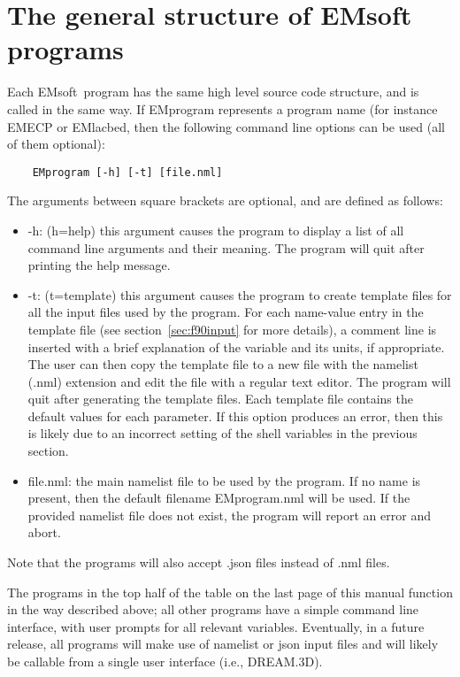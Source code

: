 \documentclass[DIV=calc, paper=letter, fontsize=11pt]{scrartcl}	 %
\newcommand{\ctp}{\textsf{EMsoft}}
\begin{document}
\section{The general structure of EMsoft programs\label{sec:structure}}
Each \ctp\ program has the same high level source code structure, and is called in the same way.  If \textsf{EMprogram} represents 
a program name (for instance \textsf{EMECP} or \textsf{EMlacbed}, then the following command line options can be used (all of them optional):
\begin{verbatim}
	EMprogram [-h] [-t] [file.nml]
\end{verbatim}
The arguments  between square brackets are optional, and are defined as follows:
\begin{itemize}
	\item \textsf{-h}: (h=help) this argument causes the program to display a list of all command line arguments and their meaning.  The program will quit after printing 
	the help message.
	\item \textsf{-t}: (t=template) this argument causes the program to create template files for all the input files used by the program.  For each
	name-value entry in the template file (see section~\ref{sec:f90input} for more details), a comment line is inserted with a brief explanation 
	of the variable and its units, if appropriate.  The user can then copy the template file to a new file with the namelist (.nml) extension and edit the 
	file with a regular text editor.  The program will quit after generating the template files.  Each template file contains the default values for each parameter.
	If this option produces an error, then this is likely due to an incorrect setting of the shell variables in the previous section.
	\item \textsf{file.nml}: the main namelist file to be used by the program.  If no name is present, then the default filename \textsf{EMprogram.nml} will be used.  If the 
	provided namelist file does not exist, the program will report an error and abort.
\end{itemize}
Note that the programs will also accept .json files instead of .nml files.

The programs in the top half of the table on the last page of this manual function in the way described above; all other programs
have a simple command line interface, with user prompts for all relevant variables.  Eventually, in a future release, all programs
will make use of namelist or json input files and will likely be callable from a single user interface (i.e., DREAM.3D).
\end{document}
